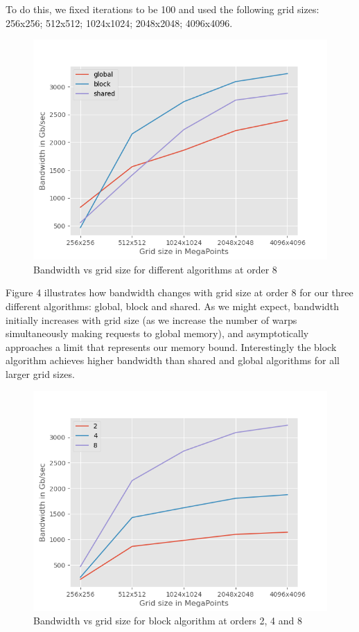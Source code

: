 \documentclass[12pt,letterpaper,twoside]{article}
\begin{document}
To do this, we fixed iterations to be 100 and used the following grid sizes: 
256x256; 512x512; 1024x1024; 2048x2048; 4096x4096.

\begin{figure}[!htbp]
    \centering
    \includegraphics[scale=0.7]{bandwidth_by_alg_ord8.png}
    \caption{Bandwidth vs grid size for different algorithms at order 8}
\end{figure}

Figure 4 illustrates how bandwidth changes with grid size at order 8 for our three 
different algorithms: global, block and shared. As we might expect, bandwidth 
initially increases with grid size (as we increase the number of warps 
simultaneously making requests to global memory), and asymptotically 
approaches a limit that represents our memory bound. Interestingly 
the block algorithm achieves higher bandwidth than shared and 
global algorithms for all larger grid sizes.

\begin{figure}[!htbp]
    \centering
    \includegraphics[scale=0.7]{bandwidth_by_order_block.png}
    \caption{Bandwidth vs grid size for block algorithm at orders 2, 4 and 8}
\end{figure}
\end{document}
